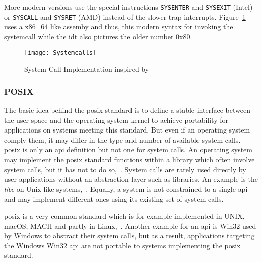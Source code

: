 More modern versions use the special instructions \texttt{SYSENTER} and \texttt{SYSEXIT} (Intel) or \texttt{SYSCALL} and \texttt{SYSRET} (AMD) instead of the slower trap interrupts\cite{decade-linux-syscalls}.
Figure~\ref{pic:syscalls} uses a x86\_64 like assemby and thus, this modern syntax for invoking the systemcall while the \ac{idt} also pictures the older number 0x80.

\begin{figure} [t]
	\centering
	\texttt{[image: Systemcalls]}
    \caption{System Call Implementation inspired by~\cite{lfd430}}\label{pic:syscalls}
\end{figure}


\subsubsection{POSIX}
The basic idea behind the \acf{posix} standard is to define a stable interface between the user-space and the operating system kernel to achieve portability for applications on systems meeting this standard.
But even if an operating system comply them, it may differ in the type and number of available system calls.
\ac{posix} is only an \ac{api} definition but not one for system calls.
An operating system may implement the \ac{posix} standard functions within a library which often involve system calls, but it has not to do so\cite{lfd430},~\cite{glatz2015betriebssysteme}.
System calls are rarely used directly by user applications without an abstraction layer such as libraries. An example is the \textit{libc} on Unix-like systems\cite{lfd430},~\cite{tanenbaum-modern-operating-systems}.
Equally, a system is not constrained to a single \ac{api} and may implement different ones using its existing set of system calls\cite{glatz2015betriebssysteme}.

\ac{posix} is a very common standard which is for example implemented in UNIX, macOS, MACH and partly in Linux\cite{tanenbaum-modern-operating-systems},~\cite{glatz2015betriebssysteme}. 
Another example for an \ac{api} is Win32 used by Windows to abstract their system calls, but as a result, applications targeting the Windows Win32 \ac{api} are not portable to systems implementing the \ac{posix} standard.


